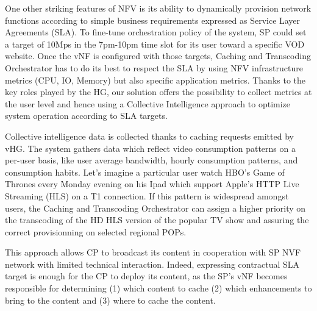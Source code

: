 One other striking features of NFV is its ability to dynamically provision network functions according to simple business requirements expressed as Service Layer Agreements (SLA).
To fine-tune orchestration policy of the system, SP could set a target of 10Mps in the 7pm-10pm time slot for its user toward a specific VOD website.
Once the vNF is configured with those targets, Caching and Transcoding Orchestrator has to do its best to respect the SLA by using NFV infrastructure metrics (CPU, IO, Memory) but also specific application metrics.
Thanks to the key roles played by the HG, our solution offers the possibility to collect metrics at the user level and hence using a Collective Intelligence approach to optimize system operation according to SLA targets. 

Collective intelligence data is collected thanks to caching requests emitted by vHG.
The system gathers data which reflect video consumption patterns on a per-user basis, like user average bandwidth, hourly consumption patterns, and consumption habits.
Let's imagine a particular user watch HBO's Game of Thrones every Monday evening on his Ipad which support Apple's HTTP Live Streaming (HLS) on a T1 connection.
If this pattern is widespread amongst users, the Caching and Transcoding Orchestrator can assign a higher priority on the transcoding of the HD HLS version of the popular TV show and assuring the correct provisionning on selected regional POPs.

This approach allows CP to broadcast its content in cooperation with SP NVF network with limited technical interaction.
Indeed, expressing contractual SLA target is enough for the CP to deploy its content, as the SP's vNF becomes responsible for determining (1) which content to cache (2) which enhancements to bring to the content and (3) where to cache the content.
